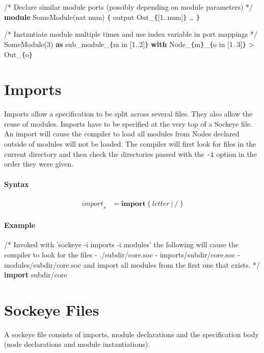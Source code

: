 \documentclass[a4paper,11pt,twoside]{report}
\begin{document}
{{{\begin{syntax}
    /* Declare similar module ports
       (possibly depending on module parameters) */
    \textbf{module} SomeModule(nat num) \verb+{+
        output Out_\verb+{+[1..num]\verb+}+
        \ldots
    \verb+}+

    /* Instantiate module multiple times
       and use index variable in port mappings */
    SomeModule(3) \textbf{as} sub_module_\verb+{+m in [1..2]\verb+}+ \textbf{with}
        Node_\verb+{+m\verb+}+_\verb+{+o in [1..3]\verb+}+ > Out_\verb+{+o\verb+}+
\end{syntax}

\section{Imports}
\label{sec:imports}
Imports allow a specification to be split across several files.
They also allow the reuse of modules.
Imports have to be specified at the very top of a Sockeye file.
An import will cause the compiler to load all modules from 
Nodes declared outside of modules will not be loaded.
The compiler will first look for files in the current directory and then check the directories passed with the \texttt{-i} option in the order they were given.

\paragraph{Syntax}
\begin{align*}
\textit{import}_s & \mathop{=}
    \textbf{import}\ \big\{\ \textit{letter}\ |\ \textbf{/}\ \big\}
\end{align*}

\paragraph{Example}
\begin{syntax}
    /* Invoked with 'sockeye -i imports -i modules' the following
       will cause the compiler to look for the files
       - ./subdir/core.soc
       - imports/subdir/core.soc
       - modules/subdir/core.soc
       and import all modules from the first one that exists. */
    \textbf{import} subdir/core
\end{syntax}

\section{Sockeye Files}
A sockeye file consists of imports, module declarations and the specification body (node declarations and module instantiations).

}}}
\end{document}
